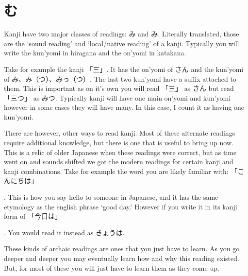 \section[読む方法]{む}\label{sec:PR漢字読む方法}

Kanji have two major classes of readings: み and み. Literally translated, those are the `sound reading' and `local/native reading' of a kanji. Typically you will write the kun'yomi in hiragana and the on'yomi in katakana.

Take for example the kanji 「三」. It has the on'yomi of さん and the kun'yomi of み、み（つ）、みっ（つ）. The last two kun'yomi have a suffix attached to them. This is important as on it's own you will read 「三」 as さん but read 「三つ」 as みつ. Typically kanji will have one main on'yomi and kun'yomi however in some cases they will have many. In this case, I count it as having one kun'yomi.

There are however, other ways to read kanji. Most of these alternate readings require additional knowledge, but there is one that is useful to bring up now. This is a relic of older Japanese when these readings were correct, but as time went on and sounds shifted we got the modern readings for certain kanji and kanji combinations. Take for example the word you are likely familiar with: 「こんにちは」\footnotemark\addtocounter{footnote}{-1}. This is how you say hello to someone in Japanese, and it has the same etymology as the english phrase `good day.' However if you write it in its kanji form of 「今日は」\footnotemark\addtocounter{footnote}{-1}. You would read it instead as きょうは\footnotemark.

These kinds of archaic readings are ones that you just have to learn. As you go deeper and deeper you may eventually learn how and why this reading existed. But, for most of these you will just have to learn them as they come up.
